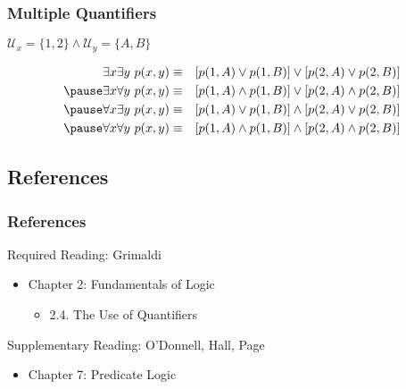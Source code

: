\documentclass[dvipsnames]{beamer}
\begin{document}
\begin{frame}
  \frametitle{Multiple Quantifiers}

  \begin{example}
    $\mathcal{U}_x = \{1,2\} \wedge \mathcal{U}_y = \{A,B\}$

    \pause
    \begin{eqnarray*}
      \exists x \exists y~p(x,y) & \equiv & [p(1,A) \vee p(1,B)]
                                       \vee [p(2,A) \vee p(2,B)]\\\pause
      \exists x \forall y~p(x,y) & \equiv & [p(1,A) \wedge p(1,B)]
                                       \vee [p(2,A) \wedge p(2,B)]\\\pause
      \forall x \exists y~p(x,y) & \equiv & [p(1,A) \vee p(1,B)]
                                     \wedge [p(2,A) \vee p(2,B)]\\\pause
      \forall x \forall y~p(x,y) & \equiv & [p(1,A) \wedge p(1,B)]
                                     \wedge [p(2,A) \wedge p(2,B)]
    \end{eqnarray*}
  \end{example}
\end{frame}

\subsection*{References}

\begin{frame}
  \frametitle{References}

  \begin{block}{Required Reading: Grimaldi}
    \begin{itemize}
      \item Chapter 2: Fundamentals of Logic
      \begin{itemize}
        \item 2.4. \alert{The Use of Quantifiers}
      \end{itemize}
    \end{itemize}
  \end{block}

  \begin{block}{Supplementary Reading: O'Donnell, Hall, Page}
    \begin{itemize}
      \item Chapter 7: Predicate Logic
    \end{itemize}
  \end{block}
\end{frame}
\end{document}
